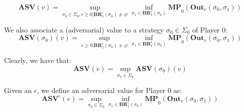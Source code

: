 


\begin{equation*}
    \mathbf{ASV}(v) = \sup\limits_{\sigma_0 \in \Sigma_0, \epsilon \geqslant 0| \mathbf{BR}^{\epsilon}_1(\sigma_0) \neq \varnothing}  \inf \limits_{\sigma_1 \in \mathbf{BR}^{\epsilon}_1(\sigma_0)} \underline{\mathbf{MP}}_0(\mathbf{Out}_v(\sigma_0,\sigma_1))
\end{equation*}

We also associate a (adversarial) value to a strategy $\sigma_0 \in \Sigma_0$ of Player 0: 
\begin{equation*}
    \mathbf{ASV}(\sigma_0)(v) = \sup\limits_{\epsilon \geqslant 0| \mathbf{BR}^{\epsilon}_1(\sigma_0) \neq \varnothing}  \inf \limits_{\sigma_1 \in \mathbf{BR}^{\epsilon}_1(\sigma_0)} \underline{\mathbf{MP}}_0(\mathbf{Out}_v(\sigma_0,\sigma_1))
\end{equation*}

Clearly, we have that:
\begin{equation*}
    \mathbf{ASV}(v) = \sup\limits_{\sigma_0 \in \Sigma_0} \mathbf{ASV}(\sigma_0)(v)
\end{equation*}

Given an $\epsilon$, we define an adversarial value for Player 0 as:
\begin{equation*}
    \mathbf{ASV}^{\epsilon}(v) = \sup\limits_{\sigma_0 \in \Sigma_0}  \inf \limits_{\sigma_1 \in \mathbf{BR}^{\epsilon}_1(\sigma_0)} \underline{\mathbf{MP}}_0(\mathbf{Out}_v(\sigma_0,\sigma_1))
\end{equation*}

